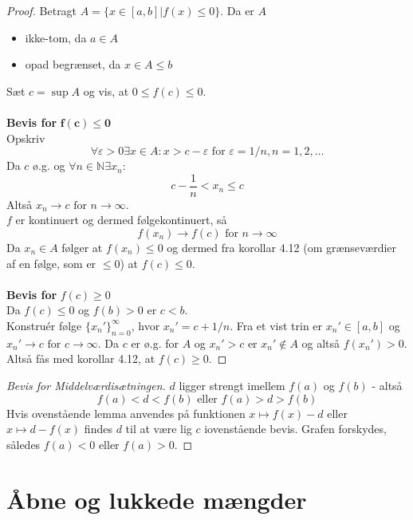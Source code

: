\begin{proof}
Betragt $A=\{x\in[a,b]|f(x)\leq0\}$. Da er $A$
\begin{itemize}
\setlength\itemsep{0em}
\item ikke-tom, da $a\in A$
\item opad begrænset, da $x\in A\leq b$
\end{itemize}
Sæt $c=\sup A$ og vis, at $0\leq f(c)\leq 0$.\\\\
\textbf{Bevis for }$\mathbf{f(c)\leq 0}$\\
Opskriv
\begin{equation}
\forall\varepsilon>0\exists x\in A: x>c-\varepsilon\text{ for } \varepsilon=1/n, n=1,2,\hdots
\end{equation}
Da $c$ ø.g. og $\forall n\in\mathbb{N}\exists x_n:$
\begin{equation}
c-\frac{1}{n}<x_n\leq c
\end{equation}
Altså $x_n\to c\text{ for } n\to\infty$.\\
$f$ er kontinuert og dermed følgekontinuert, så
\begin{equation}
f(x_n)\to f(c)\text{ for }n\to\infty
\end{equation}
Da $x_n\in A$ følger at $f(x_n)\leq 0$ og dermed fra korollar 4.12 (om grænseværdier af en følge, som er $\leq 0$) at $f(c)\leq 0$.\\\\
\textbf{Bevis for }$f(c)\geq 0$\\
Da $f(c)\leq 0$ og $f(b)>0$ er $c<b$.\\
Konstruér følge $\{x_n'\}_{n=0}^\infty$, hvor $x_n'=c+1/n$. Fra et vist trin er $x_n'\in[a,b]$ og $x_n'\to c\text{ for }c\to\infty$. Da $c$ er ø.g. for $A$ og $x_n'>c$ er $x_n'\notin A$ og altså $f(x_n')>0$. Altså fås med korollar 4.12, at $f(c)\geq 0$.
\end{proof}
\begin{proof}[Bevis for Middelværdisætningen]
$d$ ligger strengt imellem $f(a)$ og $f(b)$ - altså
\begin{equation}
f(a)<d<f(b)\text{ eller }f(a)>d>f(b)
\end{equation}
Hvis ovenstående lemma anvendes på funktionen $x\mapsto f(x)-d$ eller $x\mapsto d-f(x)$ findes $d$ til at være lig $c$ iovenstående bevis. Grafen forskydes, således $f(a)<0$ eller $f(a)>0$.
\end{proof}
\clearpage
\chapter{Åbne og lukkede mængder}

